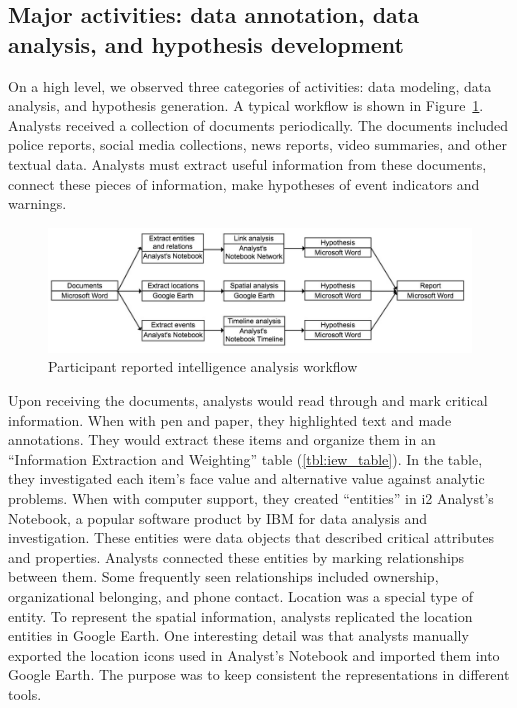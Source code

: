\subsection{Major activities: data annotation, data analysis, and hypothesis development}

On a high level, we observed three categories of activities: data modeling, data analysis, and hypothesis generation. A typical workflow is shown in Figure~\ref{fig:workflow}. Analysts received a collection of documents periodically. The documents included police reports, social media collections, news reports, video summaries, and other textual data. Analysts must extract useful information from these documents, connect these pieces of information, make hypotheses of event indicators and warnings. 

\begin{figure}
	\centering
	\includegraphics[width=\columnwidth]{./03-System/img/workflow2.jpg}
	\caption{Participant reported intelligence analysis workflow\label{fig:workflow}}
\end{figure}

Upon receiving the documents, analysts would read through and mark critical information. When with pen and paper, they highlighted text and made annotations. They would extract these items and organize them in an ``Information Extraction and Weighting'' table (\ref{tbl:iew_table}). In the table, they investigated each item's face value and alternative value against analytic problems. When with computer support, they created ``entities'' in i2 Analyst's Notebook, a popular software product by IBM for data analysis and investigation. These entities were data objects that described critical attributes and properties. Analysts connected these entities by marking relationships between them. Some frequently seen relationships included ownership, organizational belonging, and phone contact. Location was a special type of entity. To represent the spatial information, analysts replicated the location entities in Google Earth. One interesting detail was that analysts manually exported the location icons used in Analyst's Notebook and imported them into Google Earth. The purpose was to keep consistent the representations in different tools. 

